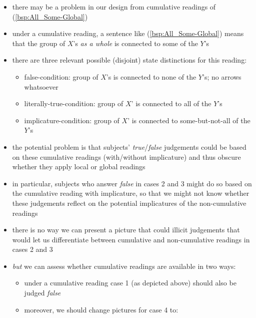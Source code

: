 \documentclass[fleqn,reqno,10pt,draft]{article}
\begin{document}
\begin{itemize}
\item there may be a problem in our design from cumulative readings of (\ref{bsp:All_Some-Global})
\item under a cumulative reading, a sentence like
  (\ref{bsp:All_Some-Global}) means that the group of $X$'s \emph{as a
  whole} is connected to some of the $Y$'s
\item there are three relevant possible (disjoint) state distinctions
  for this reading:
  \begin{itemize}
  \item false-condition: group of $X$'s is connected to none of the $Y$'s; no
    arrows whatsoever
  \item literally-true-condition: group of $X$' is connected to all of
    the $Y$'s
  \item implicature-condition: group of $X$' is connected to
    some-but-not-all of the 
    $Y$'s
  \end{itemize}
\item the potential problem is that subjects' \emph{true}/\emph{false}
  judgements could be based on these cumulative readings (with/without
  implicature) and thus obscure whether they apply local or global readings
\item in particular, subjects who answer \emph{false} in cases 2 and 3
  might do so based on the cumulative reading with implicature, so
  that we might not know whether these judgements reflect on the
  potential implicatures of the non-cumulative readings
\item there is no way we can present a picture that could illicit
  judgements that would let us differentiate between cumulative and
  non-cumulative readings in cases 2 and 3
\item \emph{but} we can assess whether cumulative readings are
  available in two ways:
  \begin{itemize}
  \item under a cumulative reading case 1 (as depicted above) should
    also be judged \emph{false}
  \item moreover, we should change pictures for case 4 to:

    \begin{center}
\end{center}
\end{itemize}
\end{itemize}
\end{document}
